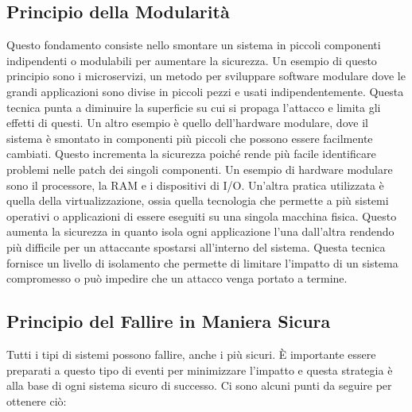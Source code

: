         \subsection{Principio della Modularità}
            Questo fondamento consiste nello smontare un sistema in piccoli componenti indipendenti o modulabili per aumentare la sicurezza.
            Un esempio di questo principio sono i microservizi, un metodo per sviluppare software modulare dove le grandi applicazioni sono divise in piccoli pezzi e usati indipendentemente. Questa tecnica punta a diminuire la superficie su cui si propaga l'attacco e limita gli effetti di questi. Un altro esempio è quello dell'hardware modulare, dove il sistema è smontato in componenti più piccoli che possono essere facilmente cambiati. Questo incrementa la sicurezza poiché rende più facile identificare problemi nelle patch dei singoli componenti. Un esempio di hardware modulare sono il processore, la RAM e i dispositivi di I/O. Un'altra pratica utilizzata è quella della virtualizzazione, ossia quella tecnologia che permette a più sistemi operativi o applicazioni di essere eseguiti su una singola macchina fisica. Questo aumenta la sicurezza in quanto isola ogni applicazione l'una dall'altra rendendo più difficile per un attaccante spostarsi all'interno del sistema.
            Questa tecnica fornisce un livello di isolamento che permette di limitare l'impatto di un sistema compromesso o può impedire che un
            attacco venga portato a termine.

\newpage
        \subsection{Principio del Fallire in Maniera Sicura}
            Tutti i tipi di sistemi possono fallire, anche i più sicuri. È importante essere preparati a questo tipo di eventi per minimizzare l'impatto e questa strategia è alla base di ogni sistema sicuro di successo. Ci sono alcuni punti da seguire per ottenere ciò:

